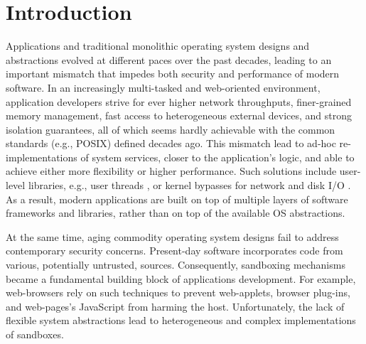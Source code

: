 \section{Introduction}

%	
%	

Applications and traditional monolithic operating system designs and abstractions evolved at different paces over the past decades, leading to an important mismatch that impedes both security and performance of modern software.
In an increasingly multi-tasked and web-oriented environment, application developers strive for ever higher network throughputs, finer-grained memory management, fast access to heterogeneous external devices, and strong isolation guarantees, all of which seems hardly achievable with the common standards (e.g., POSIX) defined decades ago.
This mismatch lead to ad-hoc re-implementations of system services, closer to the application's logic, and able to achieve either more flexibility or higher performance.
Such solutions include user-level libraries, e.g., user threads \cite{golang}, or kernel bypasses for network and disk I/O \cite{DBLP:conf/nsdi/NanavatiWW17,intel2014data,intel2016storage,BelayPKGKB14}.
As a result, modern applications are built on top of multiple layers of software frameworks and libraries, rather than on top of the available OS abstractions.

At the same time, aging commodity operating system designs fail to address contemporary security concerns.
Present-day software incorporates code from various, potentially untrusted, sources.
Consequently, sandboxing mechanisms became a fundamental building block of applications development.
For example, web-browsers rely on such techniques to prevent web-applets, browser plug-ins, and web-pages's JavaScript from harming the host.
Unfortunately, the lack of flexible system abstractions lead to heterogeneous and complex implementations of sandboxes.

